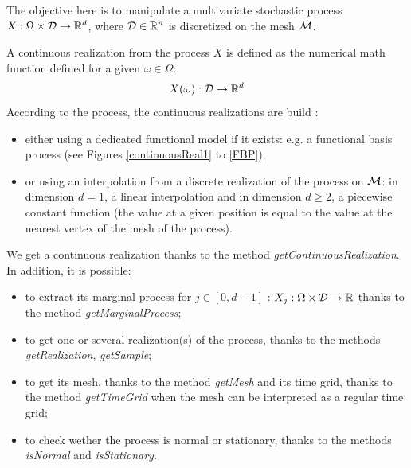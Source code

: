 \renewcommand{\filename}{docUC_StocProc_Process.tex}
\renewcommand{\filetitle}{UC : Manipulation of a process}

\HeaderIILevel

\label{UCprocess}





The objective here is to manipulate a multivariate stochastic process $X: \Omega \times {\mathcal D} \rightarrow {\mathbb R}^d$, where ${\mathcal D} \in {\mathbb R}^n$ is discretized on the mesh ${\mathcal M}$.

A continuous realization from the process $X$ is defined as the numerical math function defined for a given $\omega \in \Omega$:
\begin{align}
  X(\omega):  {\mathcal D} \rightarrow {\mathbb R}^d
\end{align}
According to the process, the continuous realizations are build :
\begin{itemize}
\item either using a dedicated functional model if it exists: e.g. a functional basis process (see Figures \ref{continuousReal1} to \ref{FBP});
\item or using an interpolation from a discrete realization of the process on ${\mathcal M}$: in  dimension $d=1$,  a linear interpolation and in dimension $d \geq 2$,  a piecewise constant function (the value at a given position is equal to the value at the nearest vertex of the mesh of the process).
\end{itemize}
We get a continuous realization  thanks to the method \emph{getContinuousRealization}. \\



In addition, it is possible:
\begin {itemize}
\item to extract its marginal process  for $ j \in [0,d-1]$ : $X_j: \Omega \times {\mathcal D} \rightarrow {\mathbb R}$ thanks to the method \emph{getMarginalProcess};
\item to get one or several realization(s) of the process, thanks to the methods \emph{getRealization}, \emph{getSample};
\item to get its mesh, thanks to the method \emph{getMesh} and its time grid, thanks to the method \emph{getTimeGrid} when the mesh can be interpreted as a regular time grid;
\item to check wether the process is normal or stationary, thanks to the methods \emph{isNormal} and \emph{isStationary}.
\end{itemize}

